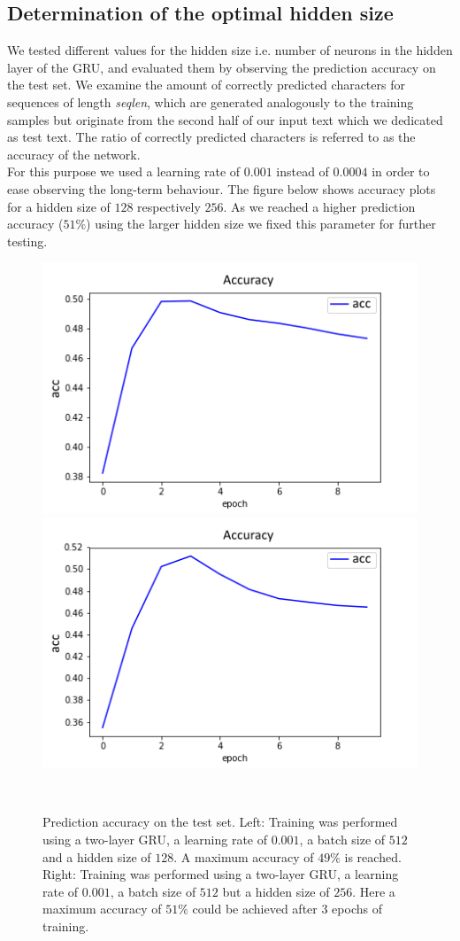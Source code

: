 \documentclass[11pt,a4paper,bibliography=totocnumbered,listof=totocnumbered]{scrartcl}
\begin{document}
\subsection{Determination of the optimal hidden size}
We tested different values for the hidden size i.e. number of neurons in the hidden layer of the GRU, and evaluated them by observing the prediction accuracy on the test set. 
We examine the amount of correctly predicted characters for sequences of length \textit{seqlen}, which are generated analogously to the training samples but originate from the second half of our input text which we dedicated as test text. The ratio of correctly predicted characters is referred to as the accuracy of the network. \\
For this purpose we used a learning rate of $0.001$ instead of $0.0004$ in order to ease observing the long-term behaviour. The figure below shows accuracy plots for a hidden size of $128$ respectively $256$. As we reached a higher prediction accuracy ($51 \%$) using the larger hidden size we fixed this parameter for further testing.  

\begin{figure}[!ht]
   \begin{minipage}{\textwidth}
     \centering
     \includegraphics[width=.4\textwidth]{acc_hs128}
     \includegraphics[width=.4\textwidth]{acc_hs256}
     \caption{Prediction accuracy on the test set. Left: Training was performed using a two-layer GRU, a learning rate of $0.001$, a batch size of $512$ and a hidden size of $128$. A maximum accuracy of $49\%$ is reached. Right: Training was performed using a two-layer GRU, a learning rate of $0.001$, a batch size of $512$ but a hidden size of $256$. Here a maximum accuracy of $51 \%$ could be achieved after 3 epochs of training.}
     \label{fig:sub1}
   \end{minipage}\\[1em]   
\end{figure}
\end{document}
